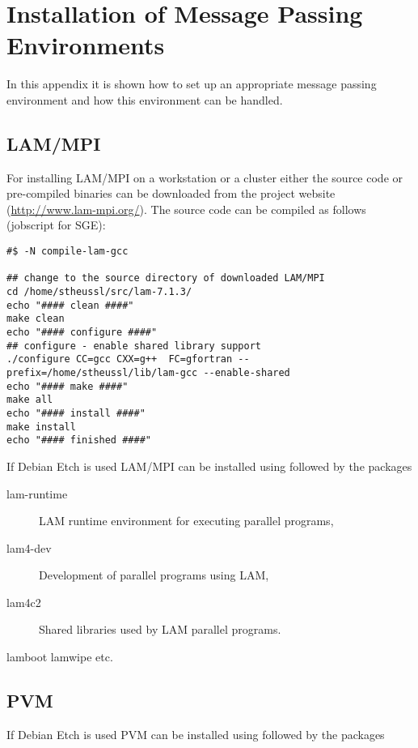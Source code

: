 
\section{Installation of Message Passing Environments}
\label{app:mpi_imp}

In this appendix it is shown how to set up an appropriate message
passing environment and how this environment can be handled.

\subsection{LAM/MPI}

For installing LAM/MPI on a workstation or a cluster
either the source code or pre-compiled binaries can be downloaded from
the project website (\url{http://www.lam-mpi.org/}).
The source code can be compiled as follows (jobscript for SGE):

\begin{verbatim}
#$ -N compile-lam-gcc

## change to the source directory of downloaded LAM/MPI
cd /home/stheussl/src/lam-7.1.3/
echo "#### clean ####"
make clean
echo "#### configure ####"
## configure - enable shared library support
./configure CC=gcc CXX=g++  FC=gfortran --prefix=/home/stheussl/lib/lam-gcc --enable-shared
echo "#### make ####"
make all
echo "#### install ####"
make install
echo "#### finished ####"
\end{verbatim}

If Debian Etch is used LAM/MPI can be installed using  followed by the packages

\begin{description}
\item[lam-runtime] LAM runtime environment for executing parallel programs,
\item[lam4-dev] Development of parallel programs using LAM,
\item[lam4c2] Shared libraries used by LAM parallel programs.
\end{description}

lamboot lamwipe etc.




\subsection{PVM}



If Debian Etch is used PVM can be installed using  followed by the packages

